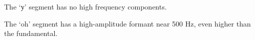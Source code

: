 \documentclass[11pt]{article}
\makeatletter
\newcommand{\boxspacing}{\kern\kvtcb@left@rule\kern\kvtcb@boxsep}
\newcommand{\prompt}[4]{
        {\ttfamily\llap{{\color{#2}[#3]:\hspace{3pt}#4}}\vspace{-\baselineskip}}
    }
\makeatother
\begin{document}
    The `у' segment has no high frequency components.

    The `oh' segment has a high-amplitude formant near 500 Hz, even higher
than the fundamental.

    \begin{tcolorbox}[breakable, size=fbox, boxrule=1pt, pad at break*=1mm,colback=cellbackground, colframe=cellborder]
\prompt{In}{incolor}{ }{\boxspacing}
\begin{Verbatim}[commandchars=\\\{\}]

\end{Verbatim}
\end{tcolorbox}

    \begin{tcolorbox}[breakable, size=fbox, boxrule=1pt, pad at break*=1mm,colback=cellbackground, colframe=cellborder]
\prompt{In}{incolor}{ }{\boxspacing}
\begin{Verbatim}[commandchars=\\\{\}]

\end{Verbatim}
\end{tcolorbox}


    
    
    
\end{document}
